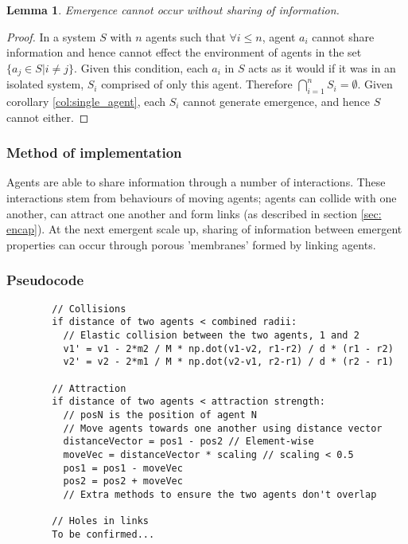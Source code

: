 \documentclass{article}
\newtheorem{lemma}[theorem]{Lemma}
\begin{document}
      \begin{lemma}
        Emergence cannot occur without sharing of information.
      \end{lemma}
      \begin{proof}

        In a system $S$ with $n$ agents such that $\forall i \leq n$, agent $a_i$ cannot share information and hence cannot effect the environment of agents in the set $\{ a_j \in S | i \not = j \}$. Given this condition, each $a_i$ in $S$ acts as it would if it was in an isolated system, $S_i$ comprised of only this agent. Therefore $\bigcap_{i=1}^nS_i = \emptyset$. Given corollary \ref{col:single_agent}, each $S_i$ cannot generate emergence, and hence $S$ cannot either. 

      \end{proof}

    \subsubsection{Method of implementation}

      Agents are able to share information through a number of interactions. These interactions stem from behaviours of moving agents; agents can collide with one another, can attract one another and form links (as described in section \ref{sec: encap}). At the next emergent scale up, sharing of information between emergent properties can occur through porous 'membranes' formed by linking agents.

    \subsubsection{Pseudocode}
      
      \begin{verbatim}
        // Collisions
        if distance of two agents < combined radii:
          // Elastic collision between the two agents, 1 and 2
          v1' = v1 - 2*m2 / M * np.dot(v1-v2, r1-r2) / d * (r1 - r2) 
          v2' = v2 - 2*m1 / M * np.dot(v2-v1, r2-r1) / d * (r2 - r1)

        // Attraction
        if distance of two agents < attraction strength:
          // posN is the position of agent N
          // Move agents towards one another using distance vector 
          distanceVector = pos1 - pos2 // Element-wise 
          moveVec = distanceVector * scaling // scaling < 0.5
          pos1 = pos1 - moveVec
          pos2 = pos2 + moveVec
          // Extra methods to ensure the two agents don't overlap

        // Holes in links
        To be confirmed...
      \end{verbatim}
\end{document}
